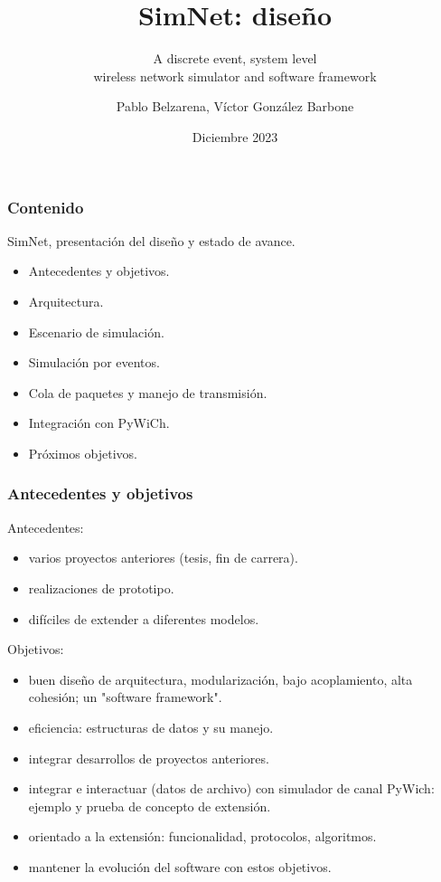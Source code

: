 \documentclass[spanish]{beamer}    %
\author[Pablo Belzarena, Víctor González Barbone]{Pablo Belzarena, Víctor González Barbone}
\title[SimNet: diseño\hspace{2em}\insertframenumber/\inserttotalframenumber]{SimNet: diseño}
\subtitle{A discrete event, system level\\ wireless network simulator and software framework}   %
\date{Diciembre 2023}     %
\institute[IIE]{Instituto de Ingeniería Eléctrica\\
   Facultad de Ingeniería\\
   Universidad de la República Uruguay  %
   }
\begin{document}

\begin{frame}
  \titlepage
\end{frame}


\begin{frame}
    \frametitle{Contenido}
    SimNet, presentación del diseño y estado de avance.
    \begin{itemize}
        \item Antecedentes y objetivos.
        \item Arquitectura.
        \item Escenario de simulación.
        \item Simulación por eventos.
        \item Cola de paquetes y manejo de transmisión.
        \item Integración con PyWiCh.
        \item Próximos objetivos.
    \end{itemize}
\end{frame}


\begin{frame}
    \frametitle{Antecedentes y objetivos}
    Antecedentes:
    \begin{itemize}
        \item varios proyectos anteriores (tesis, fin de carrera).
        \item realizaciones de prototipo.
        \item difíciles de extender a diferentes modelos.
    \end{itemize}
    Objetivos:
    \begin{itemize}
        \item buen diseño de arquitectura, modularización, bajo acoplamiento, alta cohesión; un "software framework".
        \item eficiencia: estructuras de datos y su manejo.
        \item integrar desarrollos de proyectos anteriores.
        \item integrar e interactuar (datos de archivo) con simulador de canal PyWich: ejemplo y prueba de concepto de extensión.
        \item orientado a la extensión: funcionalidad, protocolos, algoritmos.
        \item mantener la evolución del software con estos objetivos.
    \end{itemize}
\end{frame}
\end{document}
